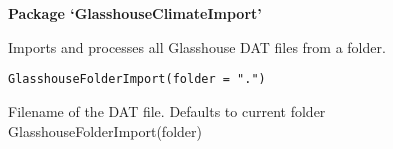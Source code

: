 \documentclass[letterpaper]{book}
\begin{document}
\chapter*{}
\begin{center}
{\textbf{\huge Package `GlasshouseClimateImport'}}
\par\bigskip{\large \today}
\end{center}
\begin{description}
\raggedright{}
\item[Title]
\item[Version]
\item[Author]\AsIs{}
\item[Maintainer]\AsIs{}
\item[Description]
\item[Depends]
\item[License]
\item[LazyData]
\end{description}
%
\begin{Description}\relax
Imports and processes all Glasshouse DAT files from a folder.
\end{Description}
%
\begin{Usage}
\begin{verbatim}
GlasshouseFolderImport(folder = ".")
\end{verbatim}
\end{Usage}
%
\begin{Arguments}
\begin{ldescription}
\item[\code{folder}] Filename of the DAT file. Defaults to current folder
GlasshouseFolderImport(folder)
\end{ldescription}
\end{Arguments}
\printindex{}
\end{document}
